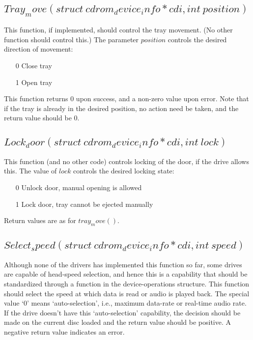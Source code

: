 \documentclass{article}
\begin{document}
\subsection{$Tray_move(struct\ cdrom_device_info * cdi, int\ position)$}

This function, if implemented, should control the tray movement. (No
other function should control this.) The parameter $position$ controls
the desired direction of movement:
\begin{itemize}
\item[0] Close tray
\item[1] Open tray
\end{itemize}
This function returns 0 upon success, and a non-zero value upon
error. Note that if the tray is already in the desired position, no
action need be taken, and the return value should be 0. 

\subsection{$Lock_door(struct\ cdrom_device_info * cdi, int\ lock)$}

This function (and no other code) controls locking of the door, if the
drive allows this. The value of $lock$ controls the desired locking
state:
\begin{itemize}
\item[0] Unlock door, manual opening is allowed
\item[1] Lock door, tray cannot be ejected manually
\end{itemize}
Return values are as for $tray_move()$.

\subsection{$Select_speed(struct\ cdrom_device_info * cdi, int\ speed)$}

Although none of the drivers has implemented this function so far,
some drives are capable of head-speed selection, and hence this is a
capability that should be standardized through a function in the
device-operations structure. This function should select the speed at
which data is read or audio is played back. The special value `0'
means `auto-selection', i.e., maximum data-rate or real-time audio
rate. If the drive doesn't have this `auto-selection' capability, the
decision should be made on the current disc loaded and the return
value should be positive. A negative return value indicates an
error. 
\end{document}
